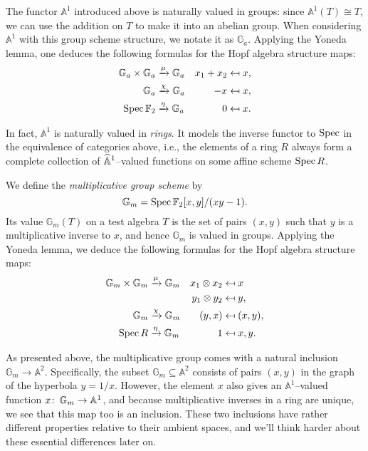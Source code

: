 \begin{example}\label{InformalAdditiveGroupExample}
The functor $\mathbb A^1$ introduced above is naturally valued in groups: since $\mathbb A^1(T) \cong T$, we can use the addition on $T$ to make it into an abelian group.  When considering $\mathbb A^1$ with this group scheme structure, we notate it as $\mathbb G_a$.  Applying the Yoneda lemma, one deduces the following formulas for the Hopf algebra structure maps:
\begin{align*}
\mathbb G_a \times \mathbb G_a & \xrightarrow{\mu} \mathbb G_a & x_1 + x_2 & \mapsfrom x, \\
\mathbb G_a & \xrightarrow{\chi} \mathbb G_a & -x & \mapsfrom x, \\
\operatorname{Spec} \mathbb F_2 & \xrightarrow{\eta} \mathbb G_a & 0 & \mapsfrom x.
\end{align*}
\end{example}

\begin{remark}
In fact, $\mathbb A^1$ is naturally valued in \emph{rings}. It models the inverse functor to $\operatorname{Spec}$ in the equivalence of categories above, i.e., the elements of a ring $R$ always form a complete collection of $\widehat{\mathbb{A}}^1$--valued functions on some affine scheme $\operatorname{Spec} R$.
\end{remark}

\begin{example}
We define the \textit{multiplicative group scheme} by \[\mathbb G_m = \operatorname{Spec} \mathbb F_2[x, y] / (xy - 1).\]  Its value $\mathbb G_m(T)$ on a test algebra $T$ is the set of pairs $(x, y)$ such that $y$ is a multiplicative inverse to $x$, and hence $\mathbb G_m$ is valued in groups.  Applying the Yoneda lemma, we deduce the following formulas for the Hopf algebra structure maps:
\begin{align*}
\mathbb G_m \times \mathbb G_m & \xrightarrow{\mu} \mathbb G_m & x_1 \otimes x_2 & \mapsfrom x \\
& & y_1 \otimes y_2 & \mapsfrom y, \\
\mathbb G_m & \xrightarrow{\chi} \mathbb G_m & (y, x) & \mapsfrom (x, y), \\
\operatorname{Spec} R & \xrightarrow{\eta} \mathbb G_m & 1 & \mapsfrom x, y.
\end{align*}
\end{example}

\begin{remark}
As presented above, the multiplicative group comes with a natural inclusion $\mathbb G_m \to \mathbb A^2$.  Specifically, the subset $\mathbb G_m \subseteq \mathbb A^2$ consists of pairs $(x, y)$ in the graph of the hyperbola $y = 1/x$.  However, the element $x$ also gives an $\mathbb A^1$--valued function $x\colon\thinspace \mathbb G_m \to \mathbb A^1$, and because multiplicative inverses in a ring are unique, we see that this map too is an inclusion.  These two inclusions have rather different properties relative to their ambient spaces, and we'll think harder about these essential differences later on.
\end{remark}

